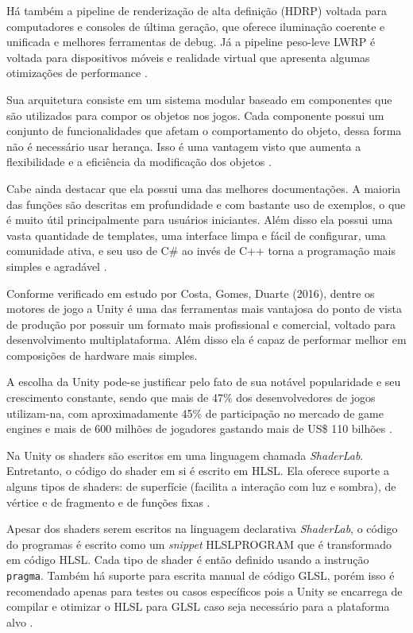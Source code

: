 Há também a pipeline de renderização de alta definição (\acrshort{HDRP}) voltada para computadores e consoles de última geração, que oferece iluminação coerente e unificada e melhores ferramentas de debug. Já a pipeline peso-leve \acrshort{LWRP} é voltada para dispositivos móveis e realidade virtual que apresenta algumas otimizações de performance \cite{hasu2018modern}.

Sua arquitetura consiste em um sistema modular baseado em componentes que são utilizados para compor os objetos nos jogos. Cada componente possui um conjunto de funcionalidades que afetam o comportamento do objeto, dessa forma não é necessário usar herança. Isso é uma vantagem visto que aumenta a flexibilidade e a eficiência da modificação dos objetos \cite{compStudyGE}.

Cabe ainda destacar que ela possui uma das melhores documentações. A maioria das funções são descritas em profundidade e com bastante uso de exemplos, o que é muito útil principalmente para usuários iniciantes. Além disso ela possui uma vasta quantidade de templates, uma interface limpa e fácil de configurar, uma comunidade ativa, e seu uso de C\# ao invés de C++ torna a programação mais simples e agradável \cite{compStudyGE}.

Conforme verificado em estudo por Costa, Gomes, Duarte (2016)\nocite{estudoUnity}, dentre os motores de jogo a Unity é uma das ferramentas mais vantajosa do ponto de vista de produção por possuir um formato mais profissional e comercial, voltado para desenvolvimento multiplataforma. Além disso ela é capaz de performar melhor em composições de hardware mais simples.

A escolha da Unity pode-se justificar pelo fato de sua notável popularidade e seu crescimento constante, sendo que mais de 47\% dos desenvolvedores de jogos utilizam-na, com aproximadamente 45\% de participação no mercado de game engines e mais de 600 milhões de jogadores gastando mais de US\$ 110 bilhões \cite{simon2015unity}.

Na Unity os shaders são escritos em uma linguagem chamada \textit{ShaderLab}. Entretanto, o código do shader em si é escrito em HLSL. Ela oferece suporte a alguns tipos de shaders: de superfície (facilita a interação com luz e sombra), de vértice e de fragmento e de funções fixas \cite{aino2020}.

Apesar dos shaders serem escritos na linguagem declarativa \textit{ShaderLab}, o código do programas é escrito como um \textit{snippet} HLSLPROGRAM que é transformado em código HLSL. Cada tipo de shader é então definido usando a instrução \texttt{pragma}. Também há suporte para escrita manual de código GLSL, porém isso é recomendado apenas para testes ou casos específicos pois a Unity se encarrega de compilar e otimizar o HLSL para GLSL caso seja necessário para a plataforma alvo \cite{hasu2018modern}. 

